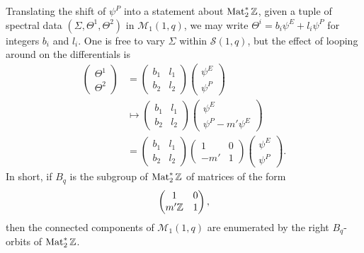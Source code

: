 \documentclass{article}
\begin{document}
Translating the shift of $\psi^P$ into a statement about $\operatorname{Mat}_2^*\mathbb{Z}$, given a tuple of spectral data $(\Sigma,\Theta^1,\Theta^2)$ in $\mathcal{M}_1(1,q)$, we may write $\Theta^i = b_i \psi^E + l_i \psi^P$ for integers $b_i$ and $l_i$. One is free to vary $\Sigma$ within $\mathcal{S}(1,q)$, but the effect of looping around on the differentials is
\begin{align*}
\begin{pmatrix}
\Theta^1 \\ \Theta^2
\end{pmatrix}
&=
\begin{pmatrix}
b_1 & l_1 \\
b_2 & l_2
\end{pmatrix}
\begin{pmatrix}
\psi^E \\ \psi^P
\end{pmatrix} \\
&\mapsto
\begin{pmatrix}
b_1 & l_1 \\
b_2 & l_2
\end{pmatrix}
\begin{pmatrix}
    \psi^E \\ \psi^P - m' \psi^E
    \end{pmatrix} \\
&=
\begin{pmatrix}
b_1 & l_1 \\
b_2 & l_2
\end{pmatrix}
\begin{pmatrix}
    1 & 0 \\
    -m' & 1
\end{pmatrix}
\begin{pmatrix}
    \psi^E \\ \psi^P
    \end{pmatrix}.
\end{align*}
In short, if $B_q$ is the subgroup of $\operatorname{Mat}_2^*\mathbb{Z}$ of matrices of the form
\[
\begin{pmatrix}
1 & 0 \\
m'\mathbb{Z} & 1
\end{pmatrix},
\]
then the connected components of $\mathcal{M}_1(1,q)$ are enumerated by the right $B_q$-orbits of $\operatorname{Mat}_2^*\mathbb{Z}$.
\end{document}
